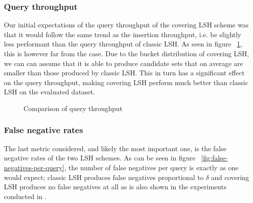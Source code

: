 \subsubsection{Query throughput}

Our initial expectations of the query throughput of the covering LSH scheme was that it would follow the same trend as the insertion throughput, i.e. be slightly less performant than the query throughput of classic LSH. As seen in figure ~\ref{fig:queries-per-second}, this is however far from the case. Due to the bucket distribution of covering LSH, we can can assume that it is able to produce candidate sets that on average are smaller than those produced by classic LSH. This in turn has a significant effect on the query throughput, making covering LSH perform much better than classic LSH on the evaluated dataset.

\begin{figure}[ht]
  \centering

  \caption{Comparison of query throughput}
  \label{fig:queries-per-second}
\end{figure}

\subsubsection{False negative rates}

The last metric considered, and likely the most important one, is the false negative rates of the two LSH schemes. As can be seen in figure ~\ref{fig:false-negatives-per-query}, the number of false negatives per query is exactly as one would expect; classic LSH produces false negatives proportional to $\delta$ and covering LSH produces no false negatives at all as is also shown in the experiments conducted in \cite{DBLP:journals/corr/PhamP16}.

